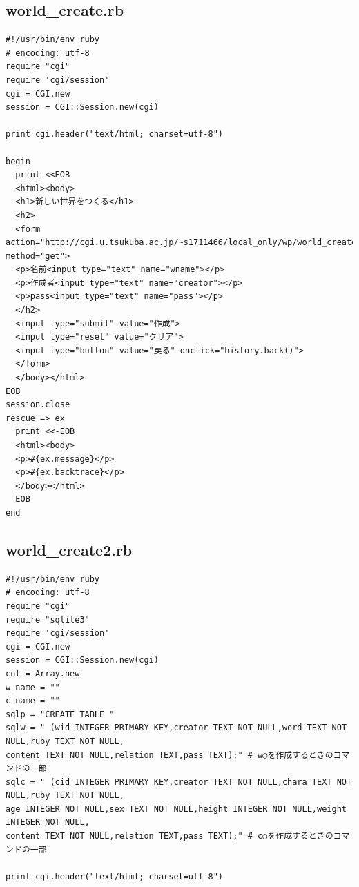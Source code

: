 \documentclass[12pt,a4paper]{jarticle}
\begin{document}
\begin{ttfamily}
\subsection*{world\_create.rb}
\begin{oframed}
 \fontsize{8pt}{8pt}\selectfont
 \begin{verbatim}
#!/usr/bin/env ruby
# encoding: utf-8
require "cgi"
require 'cgi/session'
cgi = CGI.new
session = CGI::Session.new(cgi)

print cgi.header("text/html; charset=utf-8")

begin
  print <<EOB
  <html><body>
  <h1>新しい世界をつくる</h1>
  <h2>
  <form action="http://cgi.u.tsukuba.ac.jp/~s1711466/local_only/wp/world_create2.rb" method="get">
  <p>名前<input type="text" name="wname"></p>
  <p>作成者<input type="text" name="creator"></p>
  <p>pass<input type="text" name="pass"></p>
  </h2>
  <input type="submit" value="作成">
  <input type="reset" value="クリア">
  <input type="button" value="戻る" onclick="history.back()">
  </form>
  </body></html>
EOB
session.close
rescue => ex
  print <<-EOB
  <html><body>
  <p>#{ex.message}</p>
  <p>#{ex.backtrace}</p>
  </body></html>
  EOB
end
 \end{verbatim}
\end{oframed}

\subsection*{world\_create2.rb}
\begin{oframed}
 \fontsize{8pt}{8pt}\selectfont
 \begin{verbatim}
#!/usr/bin/env ruby
# encoding: utf-8
require "cgi"
require "sqlite3"
require 'cgi/session'
cgi = CGI.new
session = CGI::Session.new(cgi)
cnt = Array.new
w_name = ""
c_name = ""
sqlp = "CREATE TABLE "
sqlw = " (wid INTEGER PRIMARY KEY,creator TEXT NOT NULL,word TEXT NOT NULL,ruby TEXT NOT NULL,
content TEXT NOT NULL,relation TEXT,pass TEXT);" # w○を作成するときのコマンドの一部
sqlc = " (cid INTEGER PRIMARY KEY,creator TEXT NOT NULL,chara TEXT NOT NULL,ruby TEXT NOT NULL,
age INTEGER NOT NULL,sex TEXT NOT NULL,height INTEGER NOT NULL,weight INTEGER NOT NULL,
content TEXT NOT NULL,relation TEXT,pass TEXT);" # c○を作成するときのコマンドの一部

print cgi.header("text/html; charset=utf-8")


\end{verbatim}
\end{oframed}
\end{ttfamily}
\end{document}
